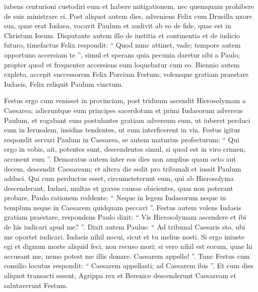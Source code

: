 \begin{biblechapter}
\begin{biblechapter}
\begin{biblechapter}
\begin{biblechapter}
\begin{biblechapter}
\begin{biblechapter}
\begin{biblechapter}
\begin{biblechapter}
\begin{biblechapter}
\begin{biblechapter}
\begin{biblechapter}
\begin{biblechapter}
\begin{biblechapter}
\begin{biblechapter}
\begin{biblechapter}
\begin{biblechapter}
\begin{biblechapter}
\begin{biblechapter}
\begin{biblechapter}
\begin{biblechapter}
\begin{biblechapter}
\begin{biblechapter}
\begin{biblechapter}
\begin{biblechapter}
\verse iubens centurioni custodiri eum et habere mitigationem, nec quemquam prohibere de suis ministrare ei.
 \verse Post aliquot autem dies, adveniens Felix cum Drusilla uxore sua, quae erat Iudaea, vocavit Paulum et audivit ab eo de fide, quae est in Christum Iesum. 
 \verse Disputante autem illo de iustitia et continentia et de iudicio futuro, timefactus Felix respondit: “ Quod nunc attinet, vade; tempore autem opportuno accersiam te ”, 
\verse simul et sperans quia pecunia daretur sibi a Paulo; propter quod et frequenter accersiens eum loquebatur cum eo.
 \verse Biennio autem expleto, accepit successorem Felix Porcium Festum; volensque gratiam praestare Iudaeis, Felix reliquit Paulum vinctum.
 
\begin{biblechapter}
\verse Festus ergo cum venisset in provinciam, post triduum ascendit Hierosolymam a Caesarea; 
\verse adieruntque eum principes sacerdotum et primi Iudaeorum adversus Paulum, et rogabant eum 
\verse postulantes gratiam adversum eum, ut iuberet perduci eum in Ierusalem, insidias tendentes, ut eum interficerent in via. 
\verse Festus igitur respondit servari Paulum in Caesarea, se autem maturius profecturum: 
\verse “ Qui ergo in vobis, ait, potentes sunt, descendentes simul, si quod est in viro crimen, accusent eum ”. 
\verse Demoratus autem inter eos dies non amplius quam octo aut decem, descendit Caesaream; et altera die sedit pro tribunali et iussit Paulum adduci. 
\verse Qui cum perductus esset, circumsteterunt eum, qui ab Hierosolyma descenderant, Iudaei, multas et graves causas obicientes, quas non poterant probare, 
\verse Paulo rationem reddente: “ Neque in legem Iudaeorum neque in templum neque in Caesarem quidquam peccavi ”. 
\verse Festus autem volens Iudaeis gratiam praestare, respondens Paulo dixit: “ Vis Hierosolymam ascendere et ibi de his iudicari apud me? ”. 
\verse Dixit autem Paulus: “ Ad tribunal Caesaris sto, ubi me oportet iudicari. Iudaeis nihil nocui, sicut et tu melius nosti. 
\verse Si ergo iniuste egi et dignum morte aliquid feci, non recuso mori; si vero nihil est eorum, quae hi accusant me, nemo potest me illis donare. Caesarem appello! ”. 
\verse Tunc Festus cum consilio locutus respondit: “ Caesarem appellasti; ad Caesarem ibis ”.
 \verse Et cum dies aliquot transacti essent, Agrippa rex et Berenice descenderunt Caesaream et salutaverunt Festum. 

\end{biblechapter}
\end{biblechapter}
\end{biblechapter}
\end{biblechapter}
\end{biblechapter}
\end{biblechapter}
\end{biblechapter}
\end{biblechapter}
\end{biblechapter}
\end{biblechapter}
\end{biblechapter}
\end{biblechapter}
\end{biblechapter}
\end{biblechapter}
\end{biblechapter}
\end{biblechapter}
\end{biblechapter}
\end{biblechapter}
\end{biblechapter}
\end{biblechapter}
\end{biblechapter}
\end{biblechapter}
\end{biblechapter}
\end{biblechapter}
\end{biblechapter}
